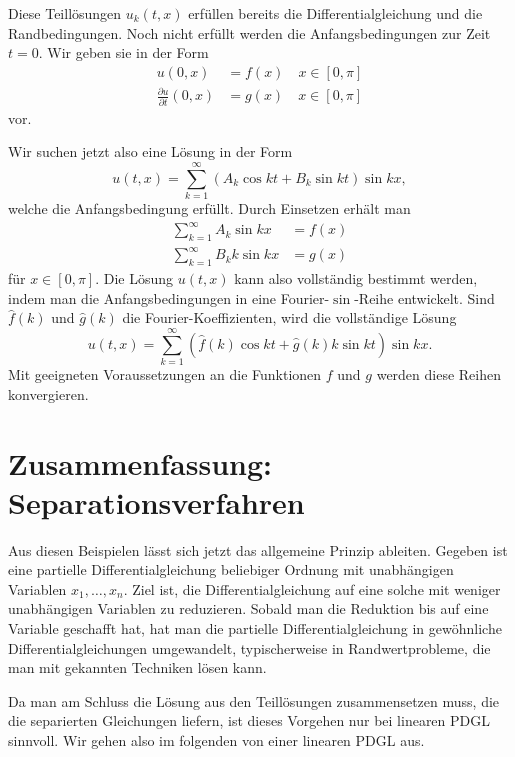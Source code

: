 Diese Teillösungen $u_k(t,x)$ erfüllen bereits die Differentialgleichung
und die Randbedingungen. Noch nicht erfüllt werden die Anfangsbedingungen
zur Zeit $t=0$. Wir geben sie in der Form
\begin{align*}
u(0,x)&=f(x)\quad x\in[0,\pi]\\
\frac{\partial u}{\partial t}(0,x)&=g(x)\quad x\in[0,\pi]
\end{align*}
vor.

Wir suchen jetzt also eine Lösung in der Form
\[
u(t,x)=\sum_{k=1}^{\infty}
\left(A_k\cos kt+B_k\sin kt\right)
\sin kx,
\]
welche die Anfangsbedingung erfüllt. Durch Einsetzen erhält
man
\begin{align*}
\sum_{k=1}^{\infty}
A_k \sin kx
&=f(x)
\\
\sum_{k=1}^{\infty}
B_kk\sin kx
&=g(x)
\end{align*}
für $x\in[0,\pi]$.
Die Lösung $u(t,x)$ kann also vollständig bestimmt werden, indem man
die Anfangsbedingungen in eine Fourier-$\sin$-Reihe entwickelt. Sind
$\hat f(k)$ und $\hat g(k)$ die Fourier-Koeffizienten, wird die
vollständige Lösung
\[
u(t,x)
=
\sum_{k=1}^{\infty}(\hat f(k)\cos kt+\hat g(k)k\sin kt)\sin kx.
\]
Mit geeigneten Voraussetzungen an die Funktionen $f$ und $g$ werden
diese Reihen konvergieren.

\section{Zusammenfassung: Separationsverfahren}
Aus diesen Beispielen lässt sich jetzt das allgemeine Prinzip 
ableiten. Gegeben ist eine partielle Differentialgleichung
beliebiger Ordnung mit unabhängigen Variablen $x_1,\dots,x_n$.
Ziel ist, die Differentialgleichung auf eine solche mit weniger
unabhängigen Variablen zu reduzieren. Sobald man die Reduktion
bis auf eine Variable geschafft hat, hat man die partielle
Differentialgleichung in gewöhnliche Differentialgleichungen
umgewandelt, typischerweise in Randwertprobleme,
die man mit gekannten Techniken lösen kann.

Da man am Schluss die Lösung aus den Teillösungen zusammensetzen
muss, die die separierten Gleichungen liefern, ist dieses Vorgehen
nur bei linearen PDGL sinnvoll. Wir gehen also im folgenden von
einer linearen PDGL aus.

